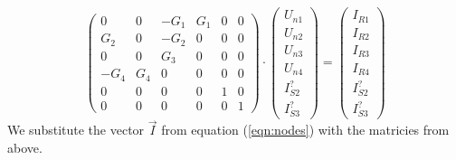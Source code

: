 {\begin{equation}
   \begin{pmatrix}
      0 & 0 & -G_1 & G_1 & 0 & 0 \\
      G_2 & 0 & -G_2 & 0 & 0 & 0 \\
      0 & 0 & G_3 & 0 & 0 & 0 \\
      -G_4 & G_4 & 0 & 0 & 0 & 0\\
      0 & 0 & 0 & 0 & 1 & 0 \\
      0 & 0 & 0 & 0 & 0 & 1 
   \end{pmatrix}
   \cdot
   \begin{pmatrix}
      U_{n1} \\ U_{n2} \\ U_{n3} \\ U_{n4} \\ I_{S2}^? \\ I_{S3}^?
   \end{pmatrix}
   =
   \begin{pmatrix}
       I_{R1} \\ I_{R2} \\ I_{R3} \\ I_{R4} \\ I_{S2}^? \\ I_{S3}^? 
   \end{pmatrix}
   \label{eqn:currents}
\end{equation}
We substitute the vector $\vec{I}$ from equation (\ref{eqn:nodes}) with the matricies from above. 

}
